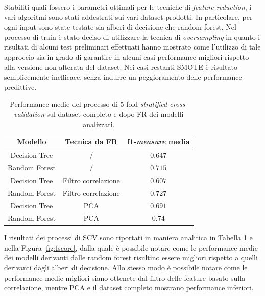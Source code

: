 Stabiliti quali fossero i parametri ottimali per le tecniche di \textit{feature reduction}, i vari algoritmi sono stati addestrati sui vari dataset prodotti. In particolare, per ogni input sono state testate sia alberi di decisione che random forest. Nel processo di train è stato deciso di utilizzare la tecnica di \textit{oversampling} in quanto i risultati di alcuni test preliminari effettuati hanno mostrato come l'utilizzo di tale approccio sia in grado di garantire in alcuni casi performance migliori rispetto alla versione non alterata del dataset. 
Nei casi restanti SMOTE è risultato semplicemente inefficace, senza indurre un peggioramento delle performance predittive.
\begin{table}
	\centering
	\caption{Performance medie del processo di 5-fold \textit{stratified cross-validation} sul dataset completo e dopo FR dei modelli analizzati.}
	\label{tab:f1score}
	\begin{tabular}{|c|c|c|}
		\toprule
		Modello & Tecnica da FR & f1-\textit{measure} media \\ 
		\midrule 
		Decision Tree & / & $0.647$ \\
		Random Forest & / & $0.715$ \\ 
		Decision Tree & Filtro correlazione & $0.607$ \\ 
		Random Forest & Filtro correlazione & $0.727$ \\ 
		Decision Tree & PCA & $0.691$ \\ 
		Random Forest & PCA & $0.74$ \\ 
		\bottomrule
	\end{tabular}
\end{table}
I risultati dei processi di SCV sono riportati in maniera analitica in Tabella \ref{tab:f1score} e nella Figura \ref{fig:fscore}, dalla quale è possibile notare come le performance medie dei modelli derivanti dalle random forest risultino essere migliori rispetto a quelli derivanti dagli alberi di decisione. Allo stesso modo è possibile notare come le performance medie migliori siano ottenete dal filtro delle feature basato sulla correlazione, mentre PCA e il dataset completo mostrano performance inferiori. 
